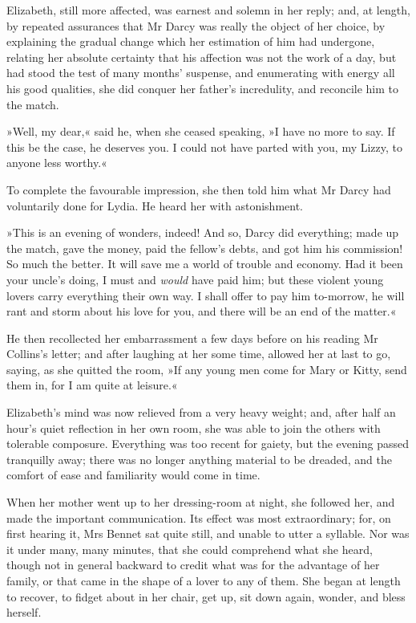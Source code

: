 Elizabeth, still more affected, was earnest and solemn in her reply; and, at length, by repeated assurances that Mr Darcy was really the object of her choice, by explaining the gradual change which her estimation of him had undergone, relating her absolute certainty that his affection was not the work of a day, but had stood the test of many months' suspense, and enumerating with energy all his good qualities, she did conquer her father's incredulity, and reconcile him to the match.

»Well, my dear,« said he, when she ceased speaking, »I have no more to say. If this be the case, he deserves you. I could not have parted with you, my Lizzy, to anyone less worthy.«

To complete the favourable impression, she then told him what Mr Darcy had voluntarily done for Lydia. He heard her with astonishment.

»This is an evening of wonders, indeed! And so, Darcy did everything; made up the match, gave the money, paid the fellow's debts, and got him his commission! So much the better. It will save me a world of trouble and economy. Had it been your uncle's doing, I must and \textit{would} have paid him; but these violent young lovers carry everything their own way. I shall offer to pay him to-morrow, he will rant and storm about his love for you, and there will be an end of the matter.«

He then recollected her embarrassment a few days before on his reading Mr Collins's letter; and after laughing at her some time, allowed her at last to go, saying, as she quitted the room, »If any young men come for Mary or Kitty, send them in, for I am quite at leisure.«

Elizabeth's mind was now relieved from a very heavy weight; and, after half an hour's quiet reflection in her own room, she was able to join the others with tolerable composure. Everything was too recent for gaiety, but the evening passed tranquilly away; there was no longer anything material to be dreaded, and the comfort of ease and familiarity would come in time.

When her mother went up to her dressing-room at night, she followed her, and made the important communication. Its effect was most extraordinary; for, on first hearing it, Mrs Bennet sat quite still, and unable to utter a syllable. Nor was it under many, many minutes, that she could comprehend what she heard, though not in general backward to credit what was for the advantage of her family, or that came in the shape of a lover to any of them. She began at length to recover, to fidget about in her chair, get up, sit down again, wonder, and bless herself.

